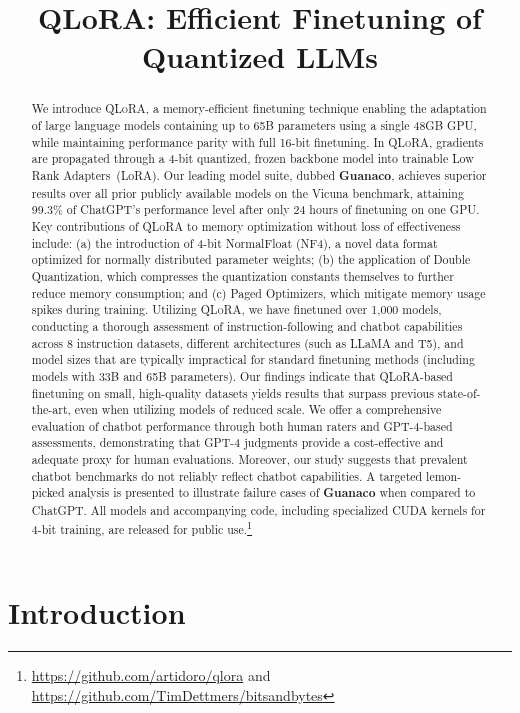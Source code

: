 \title{QLoRA: Efficient Finetuning of Quantized LLMs}

\begin{abstract}
We introduce \textsc{QLoRA}, a memory-efficient finetuning technique enabling the adaptation of large language models containing up to 65B parameters using a single 48GB GPU, while maintaining performance parity with full 16-bit finetuning. In \textsc{QLoRA}, gradients are propagated through a 4-bit quantized, frozen backbone model into trainable Low Rank Adapters~(LoRA). Our leading model suite, dubbed \textbf{Guanaco}, achieves superior results over all prior publicly available models on the Vicuna benchmark, attaining 99.3\% of ChatGPT's performance level after only 24 hours of finetuning on one GPU. Key contributions of \textsc{QLoRA} to memory optimization without loss of effectiveness include: (a) the introduction of 4-bit NormalFloat (NF4), a novel data format optimized for normally distributed parameter weights; (b) the application of Double Quantization, which compresses the quantization constants themselves to further reduce memory consumption; and (c) Paged Optimizers, which mitigate memory usage spikes during training. Utilizing \textsc{QLoRA}, we have finetuned over 1,000 models, conducting a thorough assessment of instruction-following and chatbot capabilities across 8 instruction datasets, different architectures (such as LLaMA and T5), and model sizes that are typically impractical for standard finetuning methods (including models with 33B and 65B parameters). Our findings indicate that QLoRA-based finetuning on small, high-quality datasets yields results that surpass previous state-of-the-art, even when utilizing models of reduced scale. We offer a comprehensive evaluation of chatbot performance through both human raters and GPT-4-based assessments, demonstrating that GPT-4 judgments provide a cost-effective and adequate proxy for human evaluations. Moreover, our study suggests that prevalent chatbot benchmarks do not reliably reflect chatbot capabilities. A targeted lemon-picked analysis is presented to illustrate failure cases of \textbf{Guanaco} when compared to ChatGPT. All models and accompanying code, including specialized CUDA kernels for 4-bit training, are released for public use.\footnote{\url{https://github.com/artidoro/qlora} and \url{https://github.com/TimDettmers/bitsandbytes}}
\end{abstract}

\section{Introduction}

